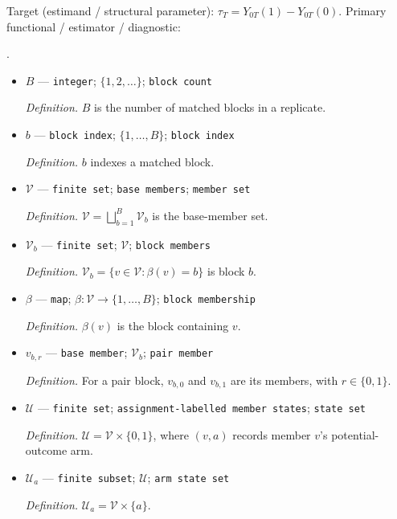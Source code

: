 \documentclass{article}
\begin{document}
Target (estimand / structural parameter): \(\tau_T=Y_{0T}(1)-Y_{0T}(0)\).
Primary functional / estimator / diagnostic: \par\noindent {}\par\noindent.
\begin{itemize}
  \item \(B\) --- \texttt{integer}; \(\{1,2,\ldots\}\); \texttt{block count}
  \par\smallskip\noindent\emph{Definition.} \(B\) is the number of matched blocks in a replicate.
  \item \(b\) --- \texttt{block index}; \(\{1,\ldots,B\}\); \texttt{block index}
  \par\smallskip\noindent\emph{Definition.} \(b\) indexes a matched block.
  \item \(\mathcal V\) --- \texttt{finite set}; \texttt{base members}; \texttt{member set}
  \par\smallskip\noindent\emph{Definition.} \(\mathcal V=\bigsqcup_{b=1}^B\mathcal V_b\) is the base-member set.
  \item \(\mathcal V_b\) --- \texttt{finite set}; \(\mathcal V\); \texttt{block members}
  \par\smallskip\noindent\emph{Definition.} \(\mathcal V_b=\{v\in\mathcal V:\beta(v)=b\}\) is block \(b\).
  \item \(\beta\) --- \texttt{map}; \(\beta:\mathcal V\to\{1,\ldots,B\}\); \texttt{block membership}
  \par\smallskip\noindent\emph{Definition.} \(\beta(v)\) is the block containing \(v\).
  \item \(v_{b,r}\) --- \texttt{base member}; \(\mathcal V_b\); \texttt{pair member}
  \par\smallskip\noindent\emph{Definition.} For a pair block, \(v_{b,0}\) and \(v_{b,1}\) are its members, with \(r\in\{0,1\}\).
  \item \(\mathcal U\) --- \texttt{finite set}; \texttt{assignment-\allowbreak{}labelled member states}; \texttt{state set}
  \par\smallskip\noindent\emph{Definition.} \(\mathcal U=\mathcal V\times\{0,1\}\), where \((v,a)\) records member \(v\)'s potential-outcome arm.
  \item \(\mathcal U_a\) --- \texttt{finite subset}; \(\mathcal U\); \texttt{arm state set}
  \par\smallskip\noindent\emph{Definition.} \(\mathcal U_a=\mathcal V\times\{a\}\).

\end{itemize}
\end{document}
